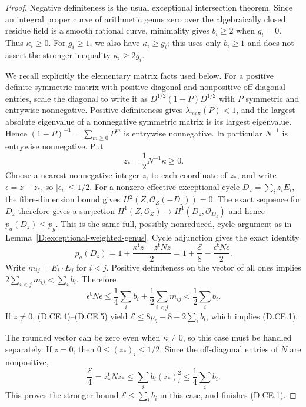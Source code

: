\begin{proof}
Negative definiteness is the usual exceptional intersection theorem.
Since an integral proper curve of arithmetic genus zero over the
algebraically closed residue field is a smooth rational curve,
minimality gives $b_i\ge2$ when $g_i=0$. Thus $\kappa_i\ge0$.
For $g_i\ge1$, we also have $\kappa_i\ge g_i$; this uses only
$b_i\ge1$ and does not assert the stronger inequality
$\kappa_i\ge2g_i$.

We recall explicitly the elementary matrix facts used below. For a
positive definite symmetric matrix with positive diagonal and
nonpositive off-diagonal entries, scale the diagonal to write it as
$D^{1/2}(1-P)D^{1/2}$ with $P$ symmetric and entrywise nonnegative.
Positive definiteness gives $\lambda_{\max}(P)<1$, and the largest
absolute eigenvalue of a nonnegative symmetric matrix is its largest
eigenvalue. Hence $(1-P)^{-1}=\sum_{m\ge0}P^m$ is entrywise
nonnegative. In particular $N^{-1}$ is entrywise nonnegative.
Put
\[
                      z_*=\frac{1}{2}N^{-1}\kappa\ge0.
\]
Choose a nearest nonnegative integer $z_i$ to each coordinate of
$z_*$, and write $\epsilon=z-z_*$, so $|\epsilon_i|\le1/2$.
For a nonzero effective exceptional cycle $D_z=\sum_i z_iE_i$,
the fibre-dimension bound gives
$H^2(Z,\mathcal O_Z(-D_z))=0$. The exact sequence for $D_z$
therefore gives a surjection
$H^1(Z,\mathcal O_Z)\to H^1(D_z,\mathcal O_{D_z})$ and hence
$p_a(D_z)\le p_g$. This is the same full, possibly nonreduced,
cycle argument as in Lemma~\ref{D:exceptional-weighted-genus}.
Cycle adjunction gives the exact identity
\[
 p_a(D_z)=1+\frac{\kappa^{\mathsf t}z-z^{\mathsf t}Nz}{2}
       =1+\frac{\mathcal E}{8}
                    -\frac{\epsilon^{\mathsf t}N\epsilon}{2}.
                                                               \tag{D.CE.4}
\]
Write $m_{ij}=E_i\cdot E_j$ for $i<j$. Positive definiteness on
the vector of all ones implies
$2\sum_{i<j}m_{ij}<\sum_i b_i$. Therefore
\[
 \epsilon^{\mathsf t}N\epsilon
 \le \frac{1}{4}\sum_i b_i+\frac{1}{2}\sum_{i<j}m_{ij}
 < \frac{1}{2}\sum_i b_i.                               \tag{D.CE.5}
\]
If $z\ne0$, (D.CE.4)--(D.CE.5) yield
$\mathcal E\le8p_g-8+2\sum_i b_i$, which implies (D.CE.1).

The rounded vector can be zero even when $\kappa\ne0$, so this
case must be handled separately. If $z=0$, then
$0\le(z_*)_i\le1/2$. Since the off-diagonal entries of $N$ are
nonpositive,
\[
 \frac{\mathcal E}{4}=z_*^{\mathsf t}Nz_*
       \le\sum_i b_i(z_*)_i^2
       \le\frac{1}{4}\sum_i b_i.
\]
This proves the stronger bound $\mathcal E\le\sum_i b_i$ in
this case, and finishes (D.CE.1).


\end{proof}
